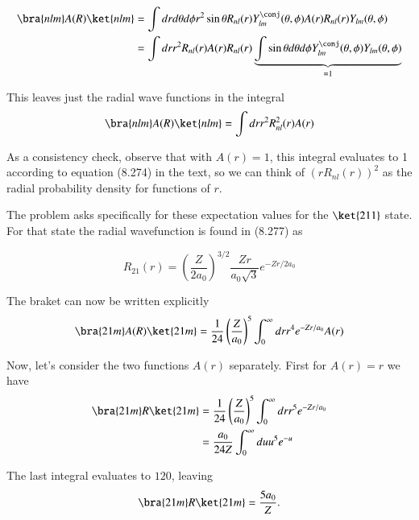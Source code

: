 \begin{align*}
\bra{nlm} A(R) \ket{nlm}
&=
\int 
dr d\theta d\phi 
r^2 \sin\theta 
R_{nl}(r) Y_{lm}^\conj(\theta, \phi)
A(r)
R_{nl}(r) Y_{lm}(\theta, \phi) \\
&=
\int 
dr 
r^2 
R_{nl}(r) 
A(r)
R_{nl}(r) 
\underbrace{\int
\sin\theta d\theta d\phi 
Y_{lm}^\conj(\theta, \phi)
Y_{lm}(\theta, \phi) }_{=1}
\\
\end{align*}

This leaves just the radial wave functions in the integral
\begin{equation}\label{eqn:qmIproblemSet4:208}
\bra{nlm} A(R) \ket{nlm}
=
\int 
dr 
r^2 
R_{nl}^2(r) 
A(r)
\end{equation}

As a consistency check, observe that with $A(r) = 1$, this integral evaluates to 1 according to equation (8.274) in the text, so we can think of $(r R_{nl}(r))^2$ as the radial probability density for functions of $r$.

The problem asks specifically for these expectation values for the $\ket{211}$ state.  For that state the radial wavefunction is found in (8.277) as

\begin{equation}\label{eqn:qmIproblemSet4:210}
R_{21}(r) = 
\left(\frac{Z}{2a_0}\right)^{3/2} \frac{ Z r }{a_0 \sqrt{3}} e^{-Z r/2 a_0}
\end{equation}

The braket can now be written explicitly 
\begin{equation}\label{eqn:qmIproblemSet4:212}
\bra{21m} A(R) \ket{21m}
=
\inv{24} \left(\frac{ Z }{a_0 } \right)^5
\int_0^\infty
dr 
r^4 
e^{-Z r/ a_0}
A(r)
\end{equation}

Now, let's consider the two functions $A(r)$ separately.  First for $A(r) = r$ we have
\begin{align*}
\bra{21m} R \ket{21m}
&=
\inv{24} \left(\frac{ Z }{a_0 } \right)^5
\int_0^\infty
dr 
r^5 
e^{-Z r/ a_0} 
\\
&=
\frac{ a_0 }{ 24 Z } 
\int_0^\infty
du 
u^5 
e^{-u} 
\\
\end{align*}

The last integral evaluates to $120$, leaving
\begin{equation}\label{eqn:qmIproblemSet4:220a}
\bra{21m} R \ket{21m}
=
\frac{ 5 a_0 }{ Z }.
\end{equation}

